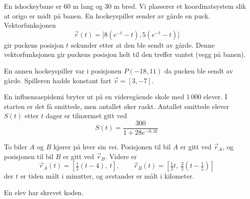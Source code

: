 En ishockeybane er 60 m lang og 30 m bred. Vi plasserer et koordinatsystem
slik at origo er midt på banen. 
En hockeyspiller sender av gårde en puck. Vektorfunksjonen 
\[
\vec{r}(t) = \big[8(e^{-t} - t), 5(e^{-t} - t)\big]
\]
gir puckens posisjon $t$ sekunder etter at den ble sendt av gårde. Denne
vektorfunksjonen gir puckens posisjon helt til den treffer vantet (vegg på
banen).


En annen hockeyspiller var i posisjonen $P(-18, 11)$ da pucken ble sendt av
gårde. Spilleren hadde konstant fart $\vec{v} = [3, -7]$.

En influensaepidemi bryter ut på en videregående skole med 1\,000 elever.
I starten er det få smittede, men antallet øker raskt. Antallet smittede
elever $S(t)$ etter $t$ dager er tilnærmet gitt ved
\[
S(t) = \frac{300}{1 + 28e^{-0{,}3t}}
\]

To biler $A$ og $B$ kjører på hver sin vei. Posisjonen til bil $A$ er gitt ved $\vec{r}_A$, og posisjonen til bil $B$ er gitt ved $\vec{r}_B$. Videre er
\[
\vec{r}_A(t) = \left[\tfrac{1}{2}(t - 4),\ t\right],\quad
\quad
\vec{r}_B(t) = \left[\tfrac{1}{2}t,\ \tfrac{3}{2}\!\left(t - \tfrac{1}{5}\right)\right]
\]
der $t$ er tiden målt i minutter, og avstander er målt i kilometer.


En elev har skrevet koden.

